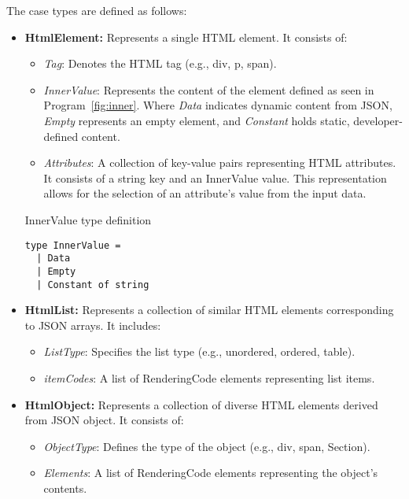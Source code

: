 The case types are defined as follows:
\begin{itemize}
	\item \textbf{HtmlElement:} Represents a single HTML element. It consists of:
	      \begin{itemize}
		      \item \emph{Tag}: Denotes the HTML tag (e.g., div, p, span). \item \emph{InnerValue}: Represents the content of the element defined as seen in Program~\ref{fig:inner}.
		            Where \emph{Data} indicates dynamic content from JSON, \emph{Empty} represents an empty element, and \emph{Constant} holds static, developer-defined content.
		      \item {\emph{Attributes}: A collection of key-value pairs representing HTML attributes.
		            It consists of a string key and an InnerValue value. This representation allows for the selection of an attribute's value from the input data.
		            }

	      \end{itemize}
	      \begin{listing}[h]
		      \caption{InnerValue type definition}
		      \label{fig:inner}
		      \begin{lstlisting}
type InnerValue =
  | Data 
  | Empty
  | Constant of string  

                  \end{lstlisting}
	      \end{listing}

	\item \textbf{HtmlList:} Represents a collection of similar HTML elements corresponding to JSON arrays. It includes:
	      \begin{itemize}
		      \item \emph{ListType}: Specifies the list type (e.g., unordered, ordered, table).
		      \item \emph{itemCodes}: A list of RenderingCode elements representing list items.

	      \end{itemize}

	\item \textbf{HtmlObject:} Represents a collection of diverse HTML elements derived from JSON object. It consists of:
	      \begin{itemize}
		      \item \emph{ObjectType}: Defines the type of the object (e.g., div, span, Section).
		      \item \emph{Elements}: A list of RenderingCode elements representing the object's contents.
	      \end{itemize}


\end{itemize}
